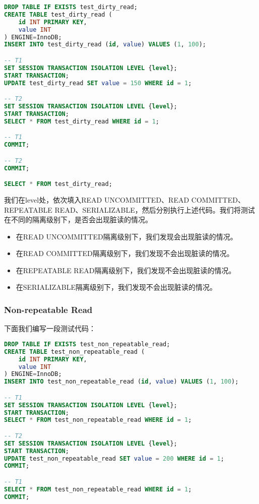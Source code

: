 \documentclass{article}
\begin{document}
\begin{lstlisting}[language=sql]
DROP TABLE IF EXISTS test_dirty_read;
CREATE TABLE test_dirty_read (
    id INT PRIMARY KEY,
    value INT
) ENGINE=InnoDB;
INSERT INTO test_dirty_read (id, value) VALUES (1, 100);

-- T1
SET SESSION TRANSACTION ISOLATION LEVEL {level};
START TRANSACTION;
UPDATE test_dirty_read SET value = 150 WHERE id = 1;

-- T2
SET SESSION TRANSACTION ISOLATION LEVEL {level};
START TRANSACTION;
SELECT * FROM test_dirty_read WHERE id = 1;

-- T1
COMMIT;

-- T2
COMMIT;

SELECT * FROM test_dirty_read;
\end{lstlisting}

我们在{level}处，依次填入READ UNCOMMITTED、READ COMMITTED、REPEATABLE READ、SERIALIZABLE，然后分别执行上述代码。我们将测试在不同的隔离级别下，是否会出现脏读的情况。

\begin{itemize}
    \item 在READ UNCOMMITTED隔离级别下，我们发现会出现脏读的情况。
    \item 在READ COMMITTED隔离级别下，我们发现不会出现脏读的情况。
    \item 在REPEATABLE READ隔离级别下，我们发现不会出现脏读的情况。
    \item 在SERIALIZABLE隔离级别下，我们发现不会出现脏读的情况。
\end{itemize}



\subsubsection{Non-repeatable Read}

下面我们编写一段测试代码：

\begin{lstlisting}[language=sql]
DROP TABLE IF EXISTS test_non_repeatable_read;
CREATE TABLE test_non_repeatable_read (
    id INT PRIMARY KEY,
    value INT
) ENGINE=InnoDB;
INSERT INTO test_non_repeatable_read (id, value) VALUES (1, 100);

-- T1
SET SESSION TRANSACTION ISOLATION LEVEL {level};
START TRANSACTION;
SELECT * FROM test_non_repeatable_read WHERE id = 1;

-- T2
SET SESSION TRANSACTION ISOLATION LEVEL {level};
START TRANSACTION;
UPDATE test_non_repeatable_read SET value = 200 WHERE id = 1;
COMMIT;

-- T1
SELECT * FROM test_non_repeatable_read WHERE id = 1;
COMMIT;
\end{lstlisting}
\end{document}
